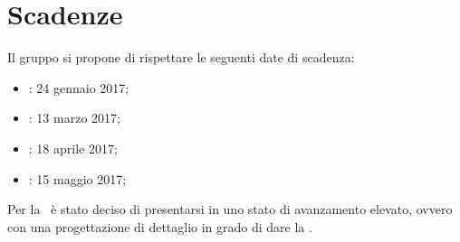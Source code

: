 \newpage
\section{Scadenze}
Il gruppo \textit{\gruppo} si propone di rispettare le seguenti date di scadenza:
\begin{itemize}
	\item \textbf{\RR}: 24 gennaio 2017;
	\item \textbf{\RP}: 13 marzo 2017;
	\item \textbf{\RQ}: 18 aprile 2017;
	\item \textbf{\RA}: 15 maggio 2017;
\end{itemize}
Per la \RP\ è stato deciso di presentarsi in uno stato di avanzamento elevato, ovvero con una progettazione di dettaglio in grado di dare la \DDP.